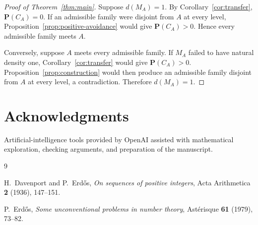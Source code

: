\documentclass[11pt]{amsart}
\theoremstyle{definition}
\numberwithin{equation}{section}
\newcommand{\Prob}{\mathbf P}
\begin{document}
\begin{proof}[Proof of Theorem~\ref{thm:main}]
Suppose $d(M_A)=1$.
By Corollary~\ref{cor:transfer}, $\Prob(C_A)=0$.
If an admissible family were disjoint from $A$ at every level, Proposition~\ref{prop:positive-avoidance} would give $\Prob(C_A)>0$.
Hence every admissible family meets $A$.

Conversely, suppose $A$ meets every admissible family.
If $M_A$ failed to have natural density one, Corollary~\ref{cor:transfer} would give $\Prob(C_A)>0$.
Proposition~\ref{prop:construction} would then produce an admissible family disjoint from $A$ at every level, a contradiction.
Therefore $d(M_A)=1$.
\end{proof}

\section*{Acknowledgments}
Artificial-intelligence tools provided by OpenAI assisted with mathematical exploration, checking arguments, and preparation of the manuscript.

\begin{thebibliography}{9}

H.~Davenport and P.~Erd\H{o}s,
\emph{On sequences of positive integers},
Acta Arithmetica \textbf{2} (1936), 147--151.

P.~Erd\H{o}s,
\emph{Some unconventional problems in number theory},
Ast\'erisque \textbf{61} (1979), 73--82.

\end{thebibliography}
\end{document}
